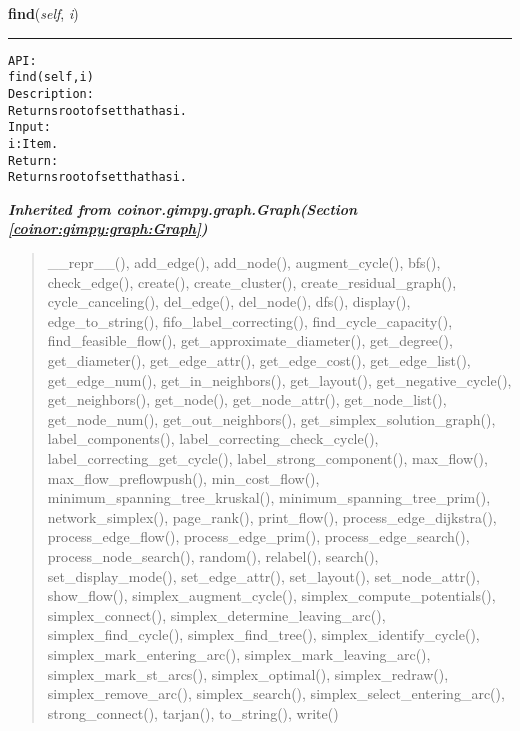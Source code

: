     \vspace{0.5ex}

\hspace{.8\funcindent}\begin{boxedminipage}{\funcwidth}

    \raggedright \textbf{find}(\textit{self}, \textit{i})

    \vspace{-1.5ex}

    \rule{\textwidth}{0.5\fboxrule}
\setlength{\parskip}{2ex}
\begin{alltt}

API:
    find(self, i)
Description:
    Returns root of set that has i.
Input:
    i: Item.
Return:
    Returns root of set that has i.
\end{alltt}

\setlength{\parskip}{1ex}
    \end{boxedminipage}


\large{\textbf{\textit{Inherited from coinor.gimpy.graph.Graph\textit{(Section \ref{coinor:gimpy:graph:Graph})}}}}

\begin{quote}
\_\_repr\_\_(), add\_edge(), add\_node(), augment\_cycle(), bfs(), check\_edge(), create(), create\_cluster(), create\_residual\_graph(), cycle\_canceling(), del\_edge(), del\_node(), dfs(), display(), edge\_to\_string(), fifo\_label\_correcting(), find\_cycle\_capacity(), find\_feasible\_flow(), get\_approximate\_diameter(), get\_degree(), get\_diameter(), get\_edge\_attr(), get\_edge\_cost(), get\_edge\_list(), get\_edge\_num(), get\_in\_neighbors(), get\_layout(), get\_negative\_cycle(), get\_neighbors(), get\_node(), get\_node\_attr(), get\_node\_list(), get\_node\_num(), get\_out\_neighbors(), get\_simplex\_solution\_graph(), label\_components(), label\_correcting\_check\_cycle(), label\_correcting\_get\_cycle(), label\_strong\_component(), max\_flow(), max\_flow\_preflowpush(), min\_cost\_flow(), minimum\_spanning\_tree\_kruskal(), minimum\_spanning\_tree\_prim(), network\_simplex(), page\_rank(), print\_flow(), process\_edge\_dijkstra(), process\_edge\_flow(), process\_edge\_prim(), process\_edge\_search(), process\_node\_search(), random(), relabel(), search(), set\_display\_mode(), set\_edge\_attr(), set\_layout(), set\_node\_attr(), show\_flow(), simplex\_augment\_cycle(), simplex\_compute\_potentials(), simplex\_connect(), simplex\_determine\_leaving\_arc(), simplex\_find\_cycle(), simplex\_find\_tree(), simplex\_identify\_cycle(), simplex\_mark\_entering\_arc(), simplex\_mark\_leaving\_arc(), simplex\_mark\_st\_arcs(), simplex\_optimal(), simplex\_redraw(), simplex\_remove\_arc(), simplex\_search(), simplex\_select\_entering\_arc(), strong\_connect(), tarjan(), to\_string(), write()
\end{quote}

